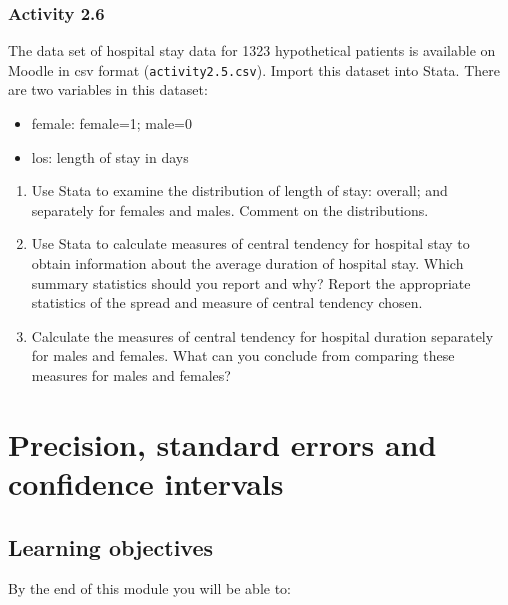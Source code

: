 \documentclass[
]{memoir}
\providecommand{\tightlist}{%
  \setlength{\itemsep}{0pt}\setlength{\parskip}{0pt}}
\begin{document}
\hypertarget{activity-2.6}{%
\subsection*{Activity 2.6}\label{activity-2.6}}

The data set of hospital stay data for 1323 hypothetical patients is available on Moodle in csv format (\texttt{activity2.5.csv}). Import this dataset into Stata. There are two variables in this dataset:

\begin{itemize}
\tightlist
\item
  female: female=1; male=0
\item
  los: length of stay in days
\end{itemize}

\begin{enumerate}
\def\labelenumi{\alph{enumi})}
\tightlist
\item
  Use Stata to examine the distribution of length of stay: overall; and separately for females and males. Comment on the distributions.
\item
  Use Stata to calculate measures of central tendency for hospital stay to obtain information about the average duration of hospital stay. Which summary statistics should you report and why? Report the appropriate statistics of the spread and measure of central tendency chosen.
\item
  Calculate the measures of central tendency for hospital duration separately for males and females. What can you conclude from comparing these measures for males and females?
\end{enumerate}

\hypertarget{precision-standard-errors-and-confidence-intervals}{%
\chapter{Precision, standard errors and confidence intervals}\label{precision-standard-errors-and-confidence-intervals}}

\hypertarget{learning-objectives-2}{%
\section*{Learning objectives}\label{learning-objectives-2}}

By the end of this module you will be able to:
\end{document}
